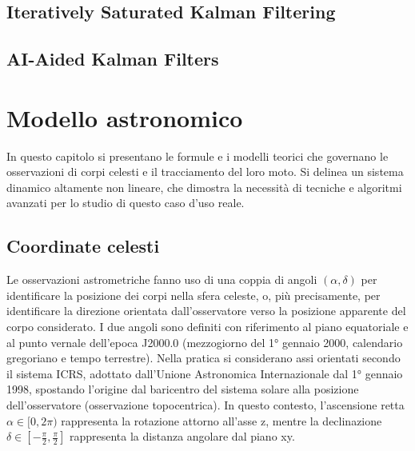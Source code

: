 \documentclass[12pt,a4paper,openright,twoside]{book}
\begin{document}
\section{Iteratively Saturated Kalman Filtering}

\section{AI-Aided Kalman Filters}
\fi

\chapter{Modello astronomico}

In questo capitolo si presentano le formule e i modelli teorici che governano le osservazioni di corpi celesti e il tracciamento del loro moto. Si delinea un sistema dinamico altamente non lineare, che dimostra la necessità di tecniche e algoritmi avanzati per lo studio di questo caso d'uso reale.

\section{Coordinate celesti}

Le osservazioni astrometriche fanno uso di una coppia di angoli $(\alpha,\delta)$ per identificare la posizione dei corpi nella sfera celeste, o, più precisamente, per identificare la direzione orientata dall'osservatore verso la posizione apparente del corpo considerato. I due angoli sono definiti con riferimento al piano equatoriale e al punto vernale dell'epoca J2000.0 (mezzogiorno del 1° gennaio 2000, calendario gregoriano e tempo terrestre). Nella pratica si considerano assi orientati secondo il sistema ICRS, adottato dall'Unione Astronomica Internazionale dal 1° gennaio 1998, spostando l'origine dal baricentro del sistema solare alla posizione dell'osservatore (osservazione topocentrica). In questo contesto, l'ascensione retta $\alpha\in[0,2\pi)$ rappresenta la rotazione attorno all'asse z, mentre la declinazione $\delta\in\left[-\frac{\pi}{2},\frac{\pi}{2}\right]$ rappresenta la distanza angolare dal piano xy. \pagebreak
\end{document}
